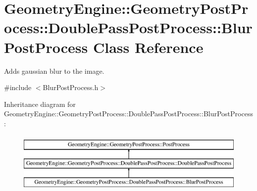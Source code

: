 \hypertarget{class_geometry_engine_1_1_geometry_post_process_1_1_double_pass_post_process_1_1_blur_post_process}{}\section{Geometry\+Engine\+::Geometry\+Post\+Process\+::Double\+Pass\+Post\+Process\+::Blur\+Post\+Process Class Reference}
\label{class_geometry_engine_1_1_geometry_post_process_1_1_double_pass_post_process_1_1_blur_post_process}


Adds gaussian blur to the image.  




{\ttfamily \#include $<$Blur\+Post\+Process.\+h$>$}

Inheritance diagram for Geometry\+Engine\+::Geometry\+Post\+Process\+::Double\+Pass\+Post\+Process\+::Blur\+Post\+Process\+:\begin{figure}[H]
\begin{center}
\leavevmode
\includegraphics[height=3.000000cm]{class_geometry_engine_1_1_geometry_post_process_1_1_double_pass_post_process_1_1_blur_post_process}
\end{center}
\end{figure}
